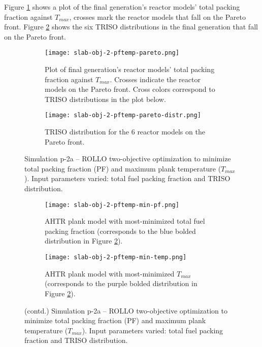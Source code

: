 Figure \ref{fig:slab-obj-2-pftemp-pareto} shows a plot of the final generation's reactor 
models' total packing fraction against $T_{max}$, crosses mark the reactor models that 
fall on the Pareto front.
Figure \ref{fig:slab-obj-2-pftemp-pareto-distr} shows the six TRISO distributions in 
the final generation that fall on the Pareto front. 
\begin{figure}[htbp!]
    \centering
    \begin{subfigure}{\textwidth}
        \texttt{[image: slab-obj-2-pftemp-pareto.png]}
        \caption{Plot of final generation's reactor models' total packing fraction against 
        $T_{max}$. Crosses indicate the reactor models on the Pareto front. Cross colors correspond  
        to TRISO distributions in the plot below.}
        \label{fig:slab-obj-2-pftemp-pareto} 
    \end{subfigure}
    \begin{subfigure}{\textwidth}
        \texttt{[image: slab-obj-2-pftemp-pareto-distr.png]}
        \caption{TRISO distribution for the 6 reactor models on the Pareto front.}
        \label{fig:slab-obj-2-pftemp-pareto-distr} 
    \end{subfigure}
    \caption{Simulation p-2a -- ROLLO two-objective optimization to minimize total packing fraction 
    (PF) and maximum plank temperature ($T_{max}$). 
    Input parameters varied: total fuel packing fraction and \gls{TRISO} distribution.}
    \label{fig:slab-obj-2-pftemp}
\end{figure}
\begin{figure}[htbp!]
    \ContinuedFloat
    \begin{subfigure}{\textwidth}
        \texttt{[image: slab-obj-2-pftemp-min-pf.png]}
        \caption{\gls{AHTR} plank model with most-minimized total fuel packing fraction
        (corresponds to the blue bolded distribution in Figure 
        \ref{fig:slab-obj-2-pftemp-pareto-distr}).}
        \label{fig:slab-obj-2-pftemp-min-pf} 
    \end{subfigure}
    \begin{subfigure}{\textwidth}
        \texttt{[image: slab-obj-2-pftemp-min-temp.png]}
        \caption{\gls{AHTR} plank model with most-minimized $T_{max}$
        (corresponds to the purple bolded distribution in Figure 
        \ref{fig:slab-obj-2-pftemp-pareto-distr}).}
        \label{fig:slab-obj-2-pftemp-min-temp} 
    \end{subfigure}
    \caption{(contd.) Simulation p-2a -- ROLLO two-objective optimization to minimize total packing fraction 
    (PF) and maximum plank temperature ($T_{max}$). 
    Input parameters varied: total fuel packing fraction and \gls{TRISO} distribution.}
\end{figure}

